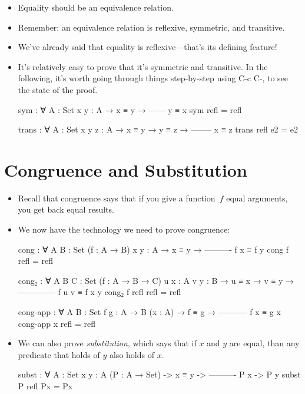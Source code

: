 \documentclass{lecturenotes}
\begin{document}
\begin{itemize}
\item Equality should be an equivalence relation.
\item Remember: an equivalence relation is reflexive, symmetric, and transitive.
\item We've already said that equality is reflexive---that's its defining feature!
\item It's relatively easy to prove that it's symmetric and transitive.
  In the following, it's worth going through things step-by-step using C-c C-, to see the state of the proof.
\begin{code}
sym : ∀ {A : Set} {x y : A} →
  x ≡ y →
  ------
  y ≡ x
sym refl = refl

trans : ∀ {A : Set} {x y z : A} →
  x ≡ y →
  y ≡ z →
  --------
  x ≡ z
trans refl e2 = e2
\end{code}
\end{itemize}

\section{Congruence and Substitution}
\label{sec:congr-subst}

\begin{itemize}
\item Recall that congruence says that if you give a function~$f$ equal arguments, you get back equal results.
\item We now have the technology we need to prove congruence:
\begin{code}
cong : ∀ {A B : Set} (f : A → B) {x y : A} →
    x ≡ y →
  ----------
  f x ≡ f y
cong f refl = refl

cong₂ : ∀ {A B C : Set} (f : A → B → C) {u x : A} {v y : B} →
      u ≡ x →
      v ≡ y →
  --------------
  f u v ≡ f x y
cong₂ f refl refl = refl

cong-app : ∀ {A B : Set} {f g : A → B} (x : A) →
     f ≡ g →
  -----------
   f x ≡ g x
cong-app x refl = refl
\end{code}
\item We can also prove \emph{substitution}, which says that if $x$ and $y$ are equal, than any predicate that holds of $y$ also holds of $x$.
\begin{code}
subst : ∀ {A : Set} {x y : A} (P : A → Set) ->
      x ≡ y ->
      ----------
      P x -> P y
subst P refl Px = Px
\end{code}
\end{itemize}
\end{document}

